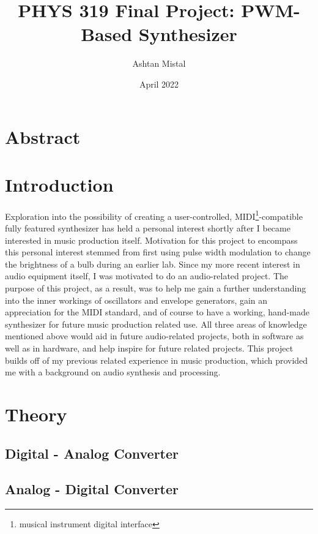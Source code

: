 \documentclass[10pt]{article}
\title{PHYS 319 Final Project: PWM-Based Synthesizer}
\author{Ashtan Mistal}
\date{April 2022}
\begin{document}
\maketitle

\break

\tableofcontents{}

\break

\section{Abstract}


\section{Introduction}

Exploration into the possibility of creating a user-controlled, MIDI\footnote{musical instrument digital interface}-compatible fully featured synthesizer has held a personal interest shortly after I became interested in music production itself. Motivation for this project to encompass this personal interest stemmed from first using pulse width modulation to change the brightness of a bulb during an earlier lab. Since my more recent interest in audio equipment itself, I was motivated to do an audio-related project. The purpose of this project, as a result, was to help me gain a further understanding into the inner workings of oscillators and envelope generators, gain an appreciation for the MIDI standard, and of course to have a working, hand-made synthesizer for future music production related use. All three areas of knowledge mentioned above would aid in future audio-related projects, both in software as well as in hardware, and help inspire for future related projects. This project builds off of my previous related experience in music production, which provided me with a background on audio synthesis and processing. 

\section{Theory}

\subsection{Digital - Analog Converter}

\subsection{Analog - Digital Converter}
\end{document}
